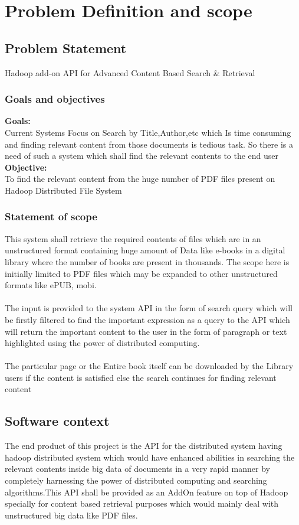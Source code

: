 \documentclass[oneside,a4paper,12pt]{report}
\begin{document}
\chapter{Problem Definition and scope}
\section{Problem Statement}
Hadoop add-on API for Advanced Content Based Search \& Retrieval

\subsection{Goals and objectives}  
\noindent \textbf{Goals:} \\
Current Systems Focus on Search by Title,Author,etc which Is time consuming and finding relevant content from those documents is tedious task. So there is a need of such a system which shall find the relevant contents to the end user \\

\noindent \textbf{Objective:} \\
To find the relevant content from the huge number of PDF files present on Hadoop Distributed File System \\


 \subsection{Statement of scope} 
This system shall retrieve the required contents of files which are in an unstructured format containing huge amount of Data like e-books in a digital library where the number of books are present in thousands. The scope here is initially limited to PDF files which may be expanded to other unstructured formats like ePUB, mobi.\\\\
The input is provided to the system API in the form of search query which will be firstly filtered to find the important expression as a query to the API which will return the important content to the user in the form of paragraph or text highlighted using the power of distributed computing. \\\\
The particular page or the Entire book itself can be downloaded by the Library users if the content is satisfied else the search continues for finding relevant content

\section{Software context} 
The end product of this project is the API for the distributed system having hadoop distributed system which would have enhanced abilities in searching the relevant contents inside big data of documents in a very rapid manner by completely harnessing the power of distributed computing and searching algorithms.This API shall be provided as an AddOn feature on top of Hadoop specially for content based retrieval purposes which would mainly deal with unstructured big data like PDF files.
\end{document}
